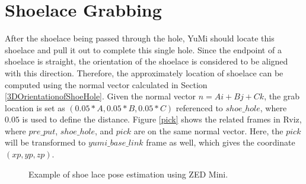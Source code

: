 \section{Shoelace Grabbing}
After the shoelace being passed through the hole, YuMi should locate this shoelace and pull it out to complete this single hole. Since the endpoint of a shoelace is straight, the orientation of the shoelace is considered to be aligned with this direction. Therefore, the approximately location of shoelace can be computed using the normal vector calculated in Section \ref{3DOrientationofShoeHole}. Given the normal vector $n = Ai + Bj + Ck$, the grab location is set as $(0.05*A, 0.05*B, 0.05*C)$ referenced to $shoe\_hole$, where $0.05$ is used to define the distance. Figure \ref{pick} shows the related frames in Rviz, where $pre\_put$, $shoe\_hole$, and $pick$ are on the same normal vector. Here, the $pick$ will be transformed to $yumi\_base\_link$ frame as well, which gives the coordinate $(xp, yp, zp)$.

\begin{figure}[H]
\centering
{}
\caption{Example of shoe lace pose estimation using ZED Mini.}
\end{figure}

